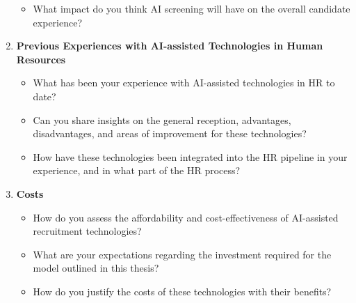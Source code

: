 \documentclass[draft,final]{thesisclass} %
\begin{document}
\begin{enumerate}
\begin{itemize}
        \item What impact do you think \acs{AI} screening will have on the overall candidate experience?
    \end{itemize}
    \item \textbf{Previous Experiences with \acs{AI}-assisted Technologies in Human Resources}
    \begin{itemize}
        \item What has been your experience with \acs{AI}-assisted technologies in \acs{HR} to date?
        \item Can you share insights on the general reception, advantages, disadvantages, and areas of improvement for these technologies?
        \item How have these technologies been integrated into the \acs{HR} pipeline in your experience, and in what part of the \acs{HR} process?
    \end{itemize}
    \item \textbf{Costs}
    \begin{itemize}
        \item How do you assess the affordability and cost-effectiveness of \acs{AI}-assisted recruitment technologies?
        \item What are your expectations regarding the investment required for the model outlined in this thesis?
        \item How do you justify the costs of these technologies with their benefits?
    \end{itemize}
\end{enumerate}
\end{document}
